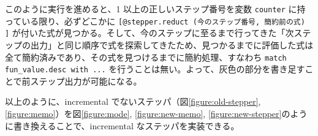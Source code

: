このように実行を進めると、1 以上の正しいステップ番号を変数 \texttt{counter} に持っている限り、必ずどこかに \texttt{[@stepper.reduct (今のステップ番号, 簡約前の式) ]} が付いた式が見つかる。そして、今のステップに至るまで行ってきた「次ステップの出力」と同じ順序で式を探索してきたため、見つかるまでに評価した式は全て簡約済みであり、その式を見つけるまでに簡約処理、すなわち \texttt{match fun\_value.desc with ...} を行うことは無い。よって、灰色の部分を書き足すことで前ステップ出力が可能になる。

以上のように、incremental でないステッパ（図\ref{figure:old-stepper}, \ref{figure:memo}）を図\ref{figure:mode}, \ref{figure:new-memo}, \ref{figure:new-stepper}のように書き換えることで、incremental なステッパを実装できる。
